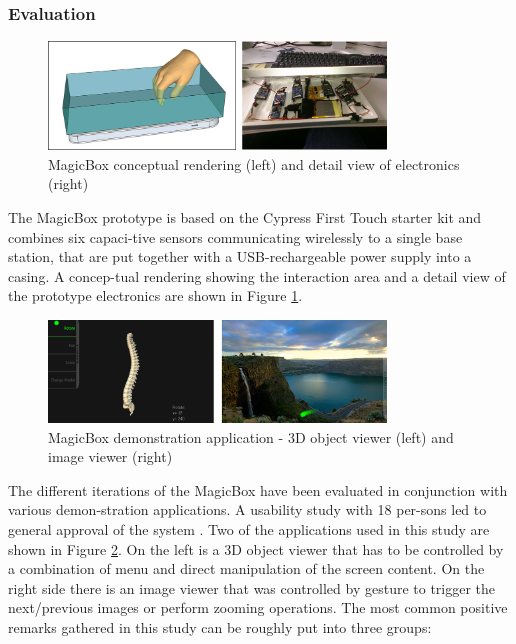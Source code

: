 \subsubsection{Evaluation}
\begin{figure}[h]
\centering
\includegraphics[width=0.8\textwidth]{images/magicbox_proto}
\caption{MagicBox conceptual rendering (left) and detail view of electronics (right) \cite{Braun2011MultiInputDevice}}
\label{fig:magicbox_proto}
\end{figure}
The MagicBox prototype is based on the Cypress First Touch starter kit \cite{cypressfirst} and combines six capaci-tive sensors communicating wirelessly to a single base station, that are put together with a USB-rechargeable power supply into a casing. A concep-tual rendering showing the interaction area and a detail view of the prototype electronics are shown in Figure \ref{fig:magicbox_proto}.
\begin{figure}[h]
\centering
\includegraphics[width=0.8\textwidth]{images/magicbox_eval}
\caption{MagicBox demonstration application - 3D object viewer (left) and image viewer (right) \cite{Braun2011MultiInputDevice}}
\label{fig:magicbox_eval}
\end{figure}
The different iterations of the MagicBox have been evaluated in conjunction with various demon-stration applications. A usability study with 18 per-sons led to general approval of the system \cite{Braun2011MultiInputDevice}. Two of the applications used in this study are shown in Figure \ref{fig:magicbox_eval}. On the left is a 3D object viewer that has to be controlled by a combination of menu and direct manipulation of the screen content. On the right side there is an image viewer that was controlled by gesture to trigger the next/previous images or perform zooming operations. The most common positive remarks gathered in this study can be roughly put into three groups:
